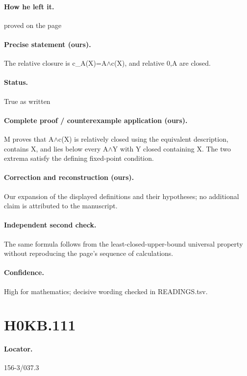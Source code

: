 \paragraph{How he left it.} proved on the page

\paragraph{Precise statement (ours).} The relative closure is c\_A(X)=A\ensuremath{\wedge}c(X), and relative 0,A are closed.

\paragraph{Status.} True as written

\paragraph{Complete proof / counterexample application (ours).} M proves that A\ensuremath{\wedge}c(X) is relatively closed using the equivalent description, contains X, and lies below every A\ensuremath{\wedge}Y with Y closed containing X. The two extrema satisfy the defining fixed-point condition.

\paragraph{Correction and reconstruction (ours).} Our expansion of the displayed definitions and their hypotheses; no additional claim is attributed to the manuscript.

\paragraph{Independent second check.} The same formula follows from the least-closed-upper-bound universal property without reproducing the page’s sequence of calculations.

\paragraph{Confidence.} High for mathematics; decisive wording checked in READINGS.tsv.

\section*{H0KB.111}\label{statement:H0KB.111}
\paragraph{Locator.} 156-3/037.3

